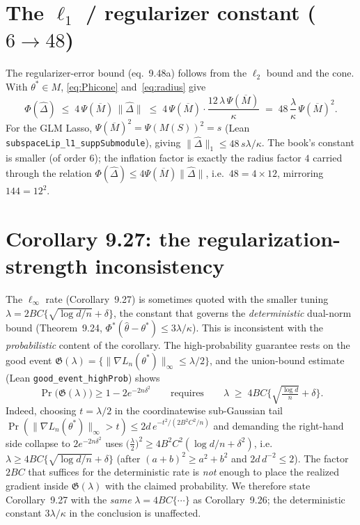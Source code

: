 \documentclass[11pt]{article}
\theoremstyle{definition}
\newcommand{\Ln}{L_n}
\newcommand{\thetast}{\theta^{*}}
\newcommand{\Mbar}{\overline{M}}
\newcommand{\Phid}{\Phi^{*}}
\newcommand{\PsM}{\Psi(\Mbar)}
\newcommand{\norm}[1]{\lVert #1 \rVert}
\begin{document}
\section{The $\ell_1$ / regularizer constant ($6\to48$)}\label{sec:ell1}

The regularizer-error bound (eq.\ 9.48a) follows from the $\ell_2$ bound and the cone. With
$\thetast\in M$, \eqref{eq:Phicone} and~\eqref{eq:radius} give
\[
  \Phi(\widehat\Delta) \;\le\; 4\,\PsM\,\norm{\widehat\Delta}
     \;\le\; 4\,\PsM\cdot\frac{12\,\lambda\,\PsM}{\kappa}
     \;=\; 48\,\frac{\lambda}{\kappa}\,\PsM^2 .
\]
For the GLM Lasso, $\PsM^2=\Psi(M(S))^2=s$ (Lean \texttt{subspaceLip\_l1\_suppSubmodule}), giving
$\norm{\widehat\Delta}_1\le 48\,s\lambda/\kappa$. The book's constant is smaller (of order $6$); the
inflation factor is exactly the radius factor $4$ carried through the relation $\Phi(\widehat\Delta)\le
4\PsM\norm{\widehat\Delta}$, i.e.\ $48 = 4\times 12$, mirroring $144=12^2$.

\section{Corollary 9.27: the regularization-strength inconsistency}\label{sec:linf}

The $\ell_\infty$ rate (Corollary~9.27) is sometimes quoted with the smaller tuning
$\lambda = 2BC\{\sqrt{\log d/n}+\delta\}$, the constant that governs the \emph{deterministic} dual-norm
bound (Theorem~9.24, $\Phid(\widehat\theta-\thetast)\le 3\lambda/\kappa$). This is inconsistent with the
\emph{probabilistic} content of the corollary. The high-probability guarantee rests on the good event
$\mathfrak{G}(\lambda)=\{\norm{\nabla\Ln(\thetast)}_\infty\le\lambda/2\}$, and the union-bound estimate
(Lean \texttt{good\_event\_highProb}) shows
\[
  \Pr\!\big(\mathfrak{G}(\lambda)\big) \ge 1-2e^{-2n\delta^2}
  \qquad\text{requires}\qquad
  \lambda \;\ge\; 4BC\Big\{\sqrt{\tfrac{\log d}{n}}+\delta\Big\}.
\]
Indeed, choosing $t=\lambda/2$ in the coordinatewise sub-Gaussian tail
$\Pr(\norm{\nabla\Ln(\thetast)}_\infty>t)\le 2d\,e^{-t^2/(2B^2C^2/n)}$ and demanding the right-hand side
collapse to $2e^{-2n\delta^2}$ uses $\big(\tfrac{\lambda}{2}\big)^2\ge 4B^2C^2(\log d/n+\delta^2)$,
i.e.\ $\lambda\ge 4BC\{\sqrt{\log d/n}+\delta\}$ (after $(a+b)^2\ge a^2+b^2$ and $2d\,d^{-2}\le 2$). The
factor $2BC$ that suffices for the deterministic rate is \emph{not} enough to place the realized
gradient inside $\mathfrak{G}(\lambda)$ with the claimed probability. We therefore state
Corollary~9.27 with the \emph{same} $\lambda=4BC\{\cdots\}$ as Corollary~9.26; the deterministic
constant $3\lambda/\kappa$ in the conclusion is unaffected.
\end{document}
